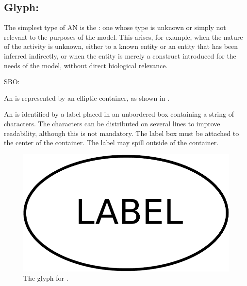 \subsection{Glyph: }
\label{af:sec:unspecifiedActivity}

The simplest type of AN is the : one whose type is unknown or simply not relevant to the purposes of the model.  This arises, for example, when the nature of the activity is unknown, either to a known entity or an entity that has been inferred indirectly, or when the entity is merely a construct introduced for the needs of the model, without direct biological relevance.

\begin{glyphDescription}

\glyphSboTerm SBO:

\glyphContainer An  is represented by an elliptic container, as shown in .

\glyphLabel An  is identified by a label placed in an unbordered box containing a string of characters.  The characters can be distributed on several lines to improve readability, although this is not mandatory.  The label box must be attached to the center of the container.  The label may spill outside of the container.

\end{glyphDescription}

\begin{figure}[H]
  \centering
  \includegraphics[scale = 0.3]{images/unspecified}
  \caption{The \AF glyph for .}
  \label{fig:af:unspecified}
\end{figure}



